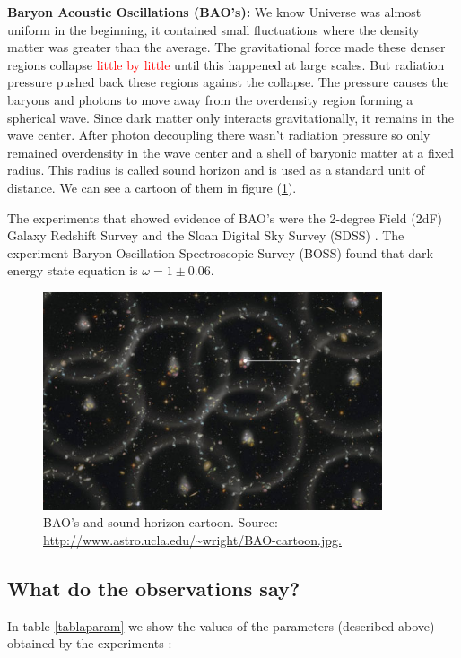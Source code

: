 \documentclass[onecolumn,           %
               showpacs,            %
               preprintnumbers,     %
               aps,                 %
               prl,          	    %
               letterpaper,             %
               superscriptaddress,      %
               nofootinbib,         %
               tightenlines,        %
               floats,floatfix      %
               ,usenatbib,
               ]{revtex4-1}
\begin{document}
\textbf{Baryon Acoustic Oscillations (BAO's):} We know Universe was almost uniform in the beginning, it contained small fluctuations where the density matter was greater than the average. The gravitational force made these denser regions collapse \textcolor{red}{little by little} until this happened at large scales. But radiation pressure pushed back these regions against the collapse. The pressure causes the baryons and photons to move away from the overdensity region forming a spherical wave. Since dark matter only interacts gravitationally, it remains in the wave center. After photon decoupling there wasn't radiation pressure so only remained overdensity in the wave center and a shell of baryonic matter at a fixed radius. This radius is called sound horizon and is used as a standard unit of distance. We can see a cartoon of them in figure (\ref{cartoon}).

The experiments that showed evidence of BAO's were the 2-degree Field (2dF) Galaxy Redshift Survey \cite{BAO3} and the Sloan Digital Sky Survey (SDSS) \cite{BAO4}. The experiment Baryon Oscillation Spectroscopic Survey (BOSS) found that dark energy state equation is $\omega = 1 \pm 0.06$.

\begin{figure}[h]
	\centering
	\includegraphics[width=10cm]{FiguresCosmo/BAO_cartoon.jpg}	
	\caption{BAO's and sound horizon cartoon. Source: \url{http://www.astro.ucla.edu/~wright/BAO-cartoon.jpg.}}
	\label{cartoon}
\end{figure}

\subsection{What do the observations say?}
In table \ref{tablaparam} we show the values of the parameters (described above) obtained by the experiments \cite{parametros}:
\end{document}
